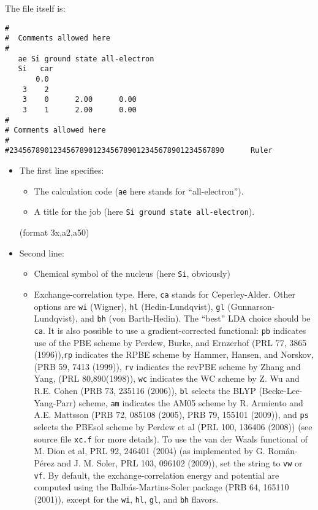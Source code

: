 \documentclass[11pt]{article}
\begin{document}
The file itself is:
\begin{verbatim}
#
#  Comments allowed here
#
   ae Si ground state all-electron
   Si   car  
       0.0
    3    2
    3    0      2.00      0.00
    3    1      2.00      0.00
#
# Comments allowed here
#
#2345678901234567890123456789012345678901234567890      Ruler
\end{verbatim}

\begin{itemize}
\item The first line specifies:
	\begin{itemize}
	\item The calculation code ({\tt ae} here stands for ``all-electron'').
	\item A title for the job (here {\tt Si ground state all-electron}).
	\end{itemize} 
	(format 3x,a2,a50)

\item Second line:
	\begin{itemize}

	\item Chemical symbol of the nucleus (here {\tt Si}, obviously)
	\item Exchange-correlation type. Here, {\tt ca} stands for
          Ceperley-Alder. Other options are {\tt wi}
          (Wigner), {\tt hl} (Hedin-Lundqvist), {\tt gl}
          (Gunnarson-Lundqvist), and {\tt bh} (von Barth-Hedin). The
          ``best'' LDA choice should be {\tt ca}.  It is also possible
          to use a gradient-corrected functional: {\tt pb} indicates use
          of the PBE scheme by Perdew, Burke, and Ernzerhof (PRL 77,
          3865 (1996)),{\tt rp} indicates the RPBE
          scheme by Hammer, Hansen, and Norskov, (PRB 59, 7413 (1999)),
          {\tt rv} indicates the revPBE
          scheme by Zhang and Yang, (PRL 80,890(1998)), 
          {\tt wc} indicates the WC
          scheme by Z. Wu and R.E. Cohen (PRB 73, 235116 (2006)),
          {\tt bl} selects the BLYP (Becke-Lee-Yang-Parr) scheme,
          {\tt am} indicates the AM05 scheme by R. Armiento and A.E. Mattsson 
          (PRB 72, 085108 (2005), PRB 79, 155101 (2009)),
          and {\tt ps} selects the PBEsol scheme by Perdew et al (PRL 100, 136406 (2008))
          (see source file {\tt xc.f} for more details).
          To use the van der Waals functional of M. Dion et al, PRL 92, 246401
          (2004) (as implemented by G. Rom\'an-P\'erez and J. M. Soler,
          PRL 103, 096102 (2009)), set the string to {\tt vw} or {\tt vf}.
	  By default, the exchange-correlation energy and potential
	  are computed using the Balb\'as-Martins-Soler package 
	  (PRB 64, 165110 (2001)), except for
	  the {\tt wi}, {\tt hl}, {\tt gl}, and {\tt bh} flavors. 
   

\end{itemize}
\end{itemize}
\end{document}
